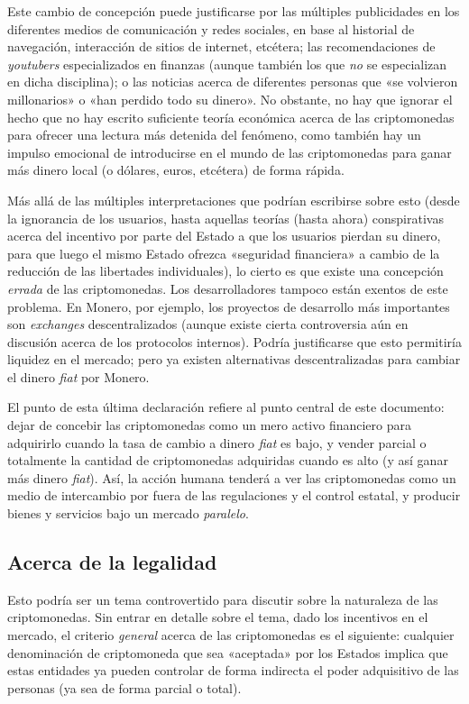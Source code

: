\documentclass[12pt,a4paper]{article}
\begin{document}
Este cambio de concepción puede justificarse por las múltiples publicidades en los diferentes medios de comunicación y redes sociales, en base al historial de navegación, interacción de sitios de internet, etcétera; las recomendaciones de \textit{youtubers} especializados en finanzas (aunque también los que \textit{no} se especializan en dicha disciplina); o las noticias acerca de diferentes personas que «se volvieron millonarios» o «han perdido todo su dinero». No obstante, no hay que ignorar el hecho que no hay escrito suficiente teoría económica acerca de las criptomonedas para ofrecer una lectura más detenida del fenómeno, como también hay un impulso emocional de introducirse en el mundo de las criptomonedas para ganar más dinero local (o dólares, euros, etcétera) de forma rápida.

Más allá de las múltiples interpretaciones que podrían escribirse sobre esto (desde la ignorancia de los usuarios, hasta aquellas teorías (hasta ahora) conspirativas acerca del incentivo por parte del Estado a que los usuarios pierdan su dinero, para que luego el mismo Estado ofrezca «seguridad financiera» a cambio de la reducción de las libertades individuales), lo cierto es que existe una concepción \textit{errada} de las criptomonedas. Los desarrolladores tampoco están exentos de este problema. En Monero, por ejemplo, los proyectos de desarrollo más importantes son \textit{exchanges} descentralizados (aunque existe cierta controversia aún en discusión acerca de los protocolos internos). Podría justificarse que esto permitiría liquidez en el mercado; pero ya existen alternativas descentralizadas para cambiar el dinero \textit{fiat} por Monero.

El punto de esta última declaración refiere al punto central de este documento: dejar de concebir las criptomonedas como un mero activo financiero para adquirirlo cuando la tasa de cambio a dinero \textit{fiat} es bajo, y vender parcial o totalmente la cantidad de criptomonedas adquiridas cuando es alto (y así ganar más dinero \textit{fiat}). Así, la acción humana tenderá a ver las criptomonedas como un medio de intercambio por fuera de las regulaciones y el control estatal, y producir bienes y servicios bajo un mercado \textit{paralelo}.

\subsection{Acerca de la legalidad}
Esto podría ser un tema controvertido para discutir sobre la naturaleza de las criptomonedas. Sin entrar en detalle sobre el tema, dado los incentivos en el mercado, el criterio \textit{general} acerca de las criptomonedas es el siguiente: cualquier denominación de criptomoneda que sea «aceptada» por los Estados implica que estas entidades ya pueden controlar de forma indirecta el poder adquisitivo de las personas (ya sea de forma parcial o total).
\end{document}
